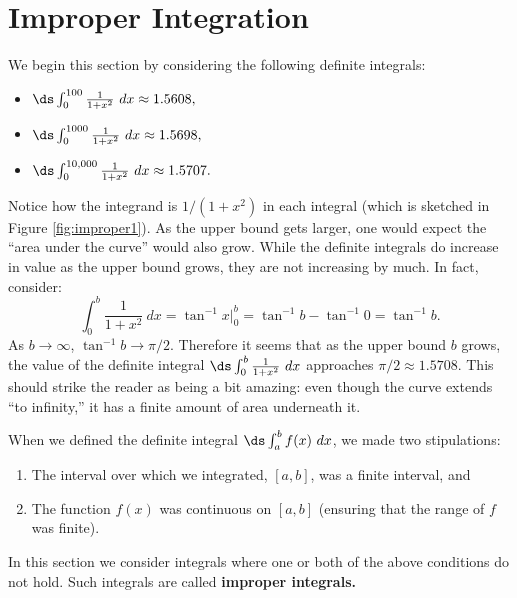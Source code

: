 \section{Improper Integration}\label{sec:improper_integration}

We begin this section by considering the following definite integrals:
\begin{itemize}
\item	$\ds \int_0^{100}\frac1{1+x^2}\ dx \approx 1.5608,$
\item	$\ds \int_0^{1000}\frac1{1+x^2}\ dx \approx 1.5698,$
\item	$\ds \int_0^{10,000}\frac1{1+x^2}\ dx \approx 1.5707.$
\end{itemize}

Notice how the integrand is $1/(1+x^2)$ in each integral (which is sketched in Figure \ref{fig:improper1}). As the upper bound gets larger, one would expect the ``area under the curve'' would also grow. While the definite integrals do increase in value as the upper bound grows, they are not  increasing by much. In fact, consider:
$$\int_0^b \frac{1}{1+x^2}\ dx = \tan^{-1}x\Big|_0^b = \tan^{-1}b-\tan^{-1}0 = \tan^{-1}b.$$
As $b\rightarrow \infty$, $\tan^{-1}b \rightarrow \pi/2.$ Therefore it seems that as the upper bound $b$ grows, the value of the definite integral $\ds \int_0^b\frac{1}{1+x^2}\ dx$ approaches $\pi/2\approx 1.5708$. This should strike the reader as being a bit amazing: even though the curve extends ``to infinity,'' it has a finite amount of area underneath it.


When we defined the definite integral $\ds\int_a^b f(x)\ dx$, we made two stipulations:
	\begin{enumerate}
	\item		The interval over which we integrated, $[a,b]$, was a finite interval, and
	\item		The function $f(x)$ was continuous on $[a,b]$ (ensuring that the range of $f$ was finite).
	\end{enumerate}
	
In this section we consider integrals where one or both of the above conditions do not hold. Such integrals are called \textbf{improper integrals.}
\clearpage

